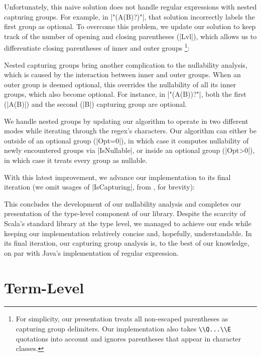 \regexNaiveIsNullable

\noindent
Unfortunately, this naive solution does not handle regular expressions with nested capturing groups.
For example, in |"(A(B)?)"|, that solution incorrectly labels the first group as optional.
To overcome this problem, we update our solution to keep track of the number of opening and closing parentheses (|Lvl|), which allows us to differentiate closing parentheses of inner and outer groups%
\footnote{
For simplicity, our presentation treats all non-escaped parentheses as capturing group delimiters.
Our implementation also takes \lstinline!\\Q...\\E! quotations into account and ignores parentheses that appear in character classes.
}:

\regexIsNullable

Nested capturing groups bring another complication to the nullability analysis, which is caused by the interaction between inner and outer groups.
When an outer group is deemed optional, this overrides the nullability of all its inner groups, which also become optional.
For instance, in |"(A(B))?"|, both the first (|A(B)|) and the second (|B|) capturing group are optional.

We handle nested groups by updating our algorithm to operate in two different modes while iterating through the regex's characters.
Our algorithm can either be outside of an optional group (|Opt=0|), in which case it computes nullability of newly encountered groups via |IsNullable|, or inside an optional group (|Opt>0|), in which case it treats every group as nullable.

With this latest improvement, we advance our implementation to its final iteration (we omit usages of |IsCapturing|, from , for brevity):

\regexLastIteration

This concludes the development of our nullability analysis and completes our presentation of the type-level component of our library.
Despite the scarcity of Scala's standard library at the type level, we managed to achieve our ends while keeping our implementation relatively concise and, hopefully, understandable.
In its final iteration, our capturing group analysis is, to the best of our knowledge, on par with Java's implementation of regular expression.

\section{Term-Level}
\label{sec:term-level}

